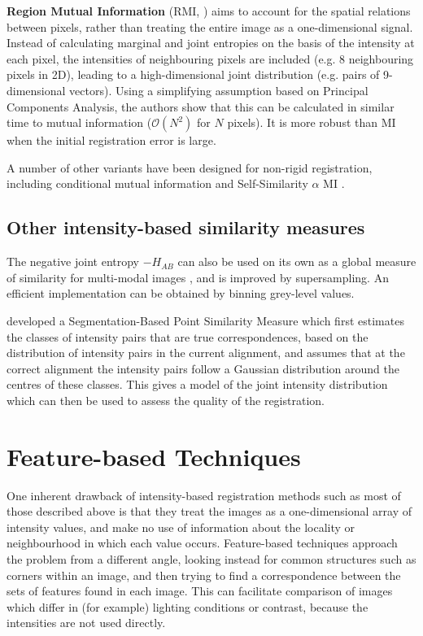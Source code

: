 \documentclass{report}
\begin{document}
\textbf{Region Mutual Information} (RMI, \cite{russakoff2004image}) aims to account for the spatial relations between pixels, rather than treating the entire image as a one-dimensional signal. Instead of calculating marginal and joint entropies on the basis of the intensity at each pixel, the intensities of neighbouring pixels are included (e.g. 8 neighbouring pixels in 2D), leading to a high-dimensional joint distribution (e.g. pairs of 9-dimensional vectors). Using a simplifying assumption based on Principal Components Analysis, the authors show that this can be calculated in similar time to mutual information ($\mathcal{O}(N^2)$ for $N$ pixels). It is more robust than MI when the initial registration error is large.

A number of other variants have been designed for non-rigid registration, including conditional mutual information \citep{loeckx2010nonrigid} and Self-Similarity $\alpha$ MI \citep{rivaz2014self}.

\subsection{Other intensity-based similarity measures}
The negative joint entropy $-H_{AB}$ can also be used on its own as a global measure of similarity for multi-modal images \citep{collignon19953d}, and is improved by supersampling. An efficient implementation can be obtained by binning grey-level values.

\cite{rogelj2003point} developed a Segmentation-Based Point Similarity Measure which first estimates the classes of intensity pairs that are true correspondences, based on the distribution of intensity pairs in the current alignment, and assumes that at the correct alignment the intensity pairs follow a Gaussian distribution around the centres of these classes. This gives a model of the joint intensity distribution which can then be used to assess the quality of the registration.



\section{Feature-based Techniques}
One inherent drawback of intensity-based registration methods such as most of those described above is that they treat the images as a one-dimensional array of intensity values, and make no use of information about the locality or neighbourhood in which each value occurs. Feature-based techniques approach the problem from a different angle, looking instead for common structures such as corners within an image, and then trying to find a correspondence between the sets of features found in each image. This can facilitate comparison of images which differ in (for example) lighting conditions or contrast, because the intensities are not used directly.
\end{document}

